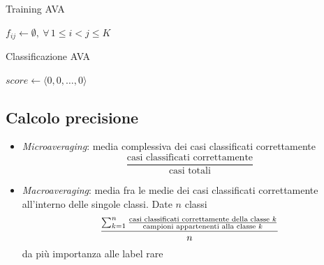 \begin{algoritmo}{Training AVA}
	\begin{algorithm}[H]
		\vskip3mm
		$f_{ij} \gets \emptyset,\ \forall\, 1 \leq i < j \leq K$\;
	\end{algorithm}
\end{algoritmo}


\begin{algoritmo}{Classificazione AVA}
	\begin{algorithm}[H]
		\vskip3mm
		$score \gets \langle 0,0,\dots,0 \rangle$ 
	\end{algorithm}
\end{algoritmo}

\subsection{Calcolo precisione}
\begin{itemize}
	\item \textit{Microaveraging}: media complessiva dei casi classificati correttamente
	      \[
		      \frac{\text{casi classificati correttamente}}{\text{casi totali}}
	      \]
	\item \textit{Macroaveraging}: media fra le medie dei casi classificati correttamente all'interno delle singole classi. Date $ n $ classi
	      \[
		      \frac{\sum_{k=1}^{n} \frac{\text{casi classificati correttamente della classe $ k $}}{\text{campioni appartenenti alla classe $ k $}}}{n}
	      \]
	      da più importanza alle label rare
\end{itemize}
